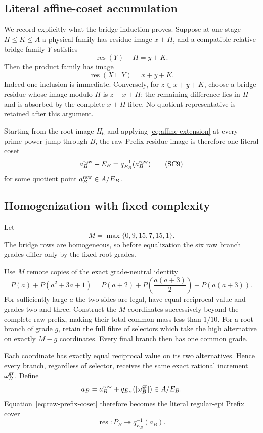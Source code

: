\subsection{Literal affine-coset accumulation}

We record explicitly what the bridge induction proves.  Suppose at one stage
$H\le K\le A$ a physical family has residue image $x+H$, and a compatible
relative bridge family $Y$ satisfies
\[
\operatorname{res}(Y)+H=y+K.
\]
Then the product family has image
\[
\operatorname{res}(X\sqcup Y)=x+y+K.
\tag{SC8}\label{eq:affine-extension}
\]
Indeed one inclusion is immediate.  Conversely, for
$z\in x+y+K$, choose a bridge residue whose image modulo $H$ is
$z-x+H$; the remaining difference lies in $H$ and is absorbed by the complete
$x+H$ fibre.  No quotient representative is retained after this argument.

Starting from the root image $H_6$ and applying
\eqref{eq:affine-extension} at every prime-power jump through $B$, the raw
Prefix residue image is therefore one literal coset
\[
a_B^{\rm raw}+E_B
=q_{E_B}^{-1}(a_B^{\rm raw})
\tag{SC9}\label{eq:raw-prefix-coset}
\]
for some quotient point $a_B^{\rm raw}\in A/E_B$.

\subsection{Homogenization with fixed complexity}

Let
\[
M=\max\{0,9,15,7,15,1\}.
\]
The bridge rows are homogeneous, so before equalization the six raw branch
grades differ only by the fixed root grades.

Use $M$ remote copies of the exact grade-neutral identity
\[
P(a)+P(a^2+3a+1)
=
P(a+2)+P\!\left(\frac{a(a+3)}2\right)+P(a(a+3)).
\tag{SC10}\label{eq:source-closed-grade-neutral}
\]
For sufficiently large $a$ the two sides are legal, have equal reciprocal
value and grades two and three.  Construct the $M$ coordinates successively
beyond the complete raw prefix, making their total common mass less than
$1/10$.  For a root branch of grade $g$, retain the full fibre of selectors
which take the high alternative on exactly $M-g$ coordinates.  Every final
branch then has one common grade.

Each coordinate has exactly equal reciprocal value on its two alternatives.
Hence every branch, regardless of selector, receives the same exact rational
increment $\omega_B^{\rm gr}$.  Define
\[
a_B=a_B^{\rm raw}+q_{E_B}([\omega_B^{\rm gr}])\in A/E_B.
\]
Equation~\eqref{eq:raw-prefix-coset} therefore becomes the literal regular-epi
Prefix cover
\[
\operatorname{res}:P_B\twoheadrightarrow q_{E_B}^{-1}(a_B).
\tag{SC11}\label{eq:prefix-literal-coset}
\]

